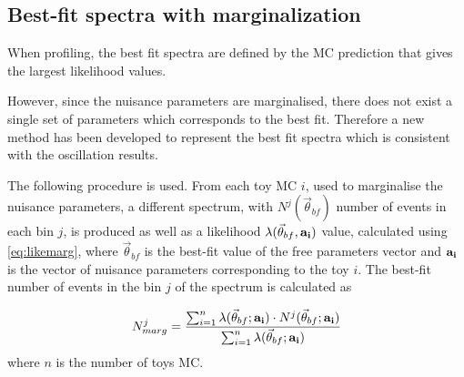 
\subsection{Best-fit spectra with marginalization}
\label{sec:spectra_bestfit_method}

When profiling, the best fit spectra are defined by the MC prediction that gives the largest likelihood values.


However, since the nuisance parameters are marginalised, there does not exist a single set 
of parameters
which corresponds to the best fit. Therefore a new method has been developed to 
represent the best fit spectra which is consistent with the oscillation results. 


The following procedure is used.
From each toy MC $i$, 
used to marginalise the nuisance parameters, 
a different spectrum,
with 
$N^{j}(\vec{\theta}_{bf})$ 
number of events in each bin $j$, 
is produced
as well as a likelihood $\lambda (\vec{\theta}_{bf},\bf{a_i}) $ value, 
calculated using \cref{eq:likemarg},
where 
$\vec{\theta}_{bf}$ is the best-fit value of the free parameters vector
and 
$\bf{a_i}$
is the vector of nuisance parameters corresponding to the toy $i$.
The best-fit number of events in the bin $j$ of the spectrum is calculated as

\begin{equation} \label{eq:bestfit_spectrum_marg}
N^j_{marg} = \frac{ \sum_{i=1}^{n} \lambda (\vec{\theta}_{bf}; {\bf a_i}) \cdot N^{j}(\vec{\theta}_{bf}; {\bf a_i}) }{ \sum_{i=1}^{n} \lambda (\vec{\theta}_{bf}; {\bf a_i})  }
\end{equation}
where $n$ is the number of toys MC.

